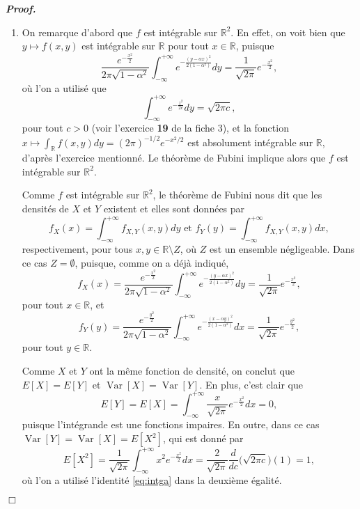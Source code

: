 \documentclass[11pt,a4paper]{article}
\newcommand{\RR}{\mathbb{R}}
\newenvironment{preuve}[1][]
{\vskip 2mm  \noindent\emph{\bf Proof#1. }}{$\Box$ \vskip 2mm}
\newcounter{exercice}
\begin{document}
		\begin{preuve}
			\begin{enumerate}
				\item On remarque d'abord que $f$ est intégrable sur $\RR^{2}$. 
				En effet, on voit bien que $y \mapsto f(x,y)$ est intégrable sur $\RR$ pour tout $x \in \RR$, 
				puisque 
				\[     \frac{e^{-\frac{x^2}{2}}}{2\pi \sqrt{1-\alpha^2}} \int_{- \infty}^{+ \infty} e^{-\frac{(y-\alpha x)^{2}}{2(1-\alpha^2)}} dy 
				= \frac{1}{\sqrt{2 \pi}} e^{-\frac{x^2}{2}},      \]
				où l'on a utilisé que 
				\begin{equation}
				\label{eq:intga}
				\int_{- \infty}^{+ \infty} e^{-\frac{z^{2}}{2 c}} dy = \sqrt{2 \pi c},
				\end{equation}          
				pour tout $c > 0$ (voir l'exercice \textbf{19} de la fiche 3), 
				et la fonction $x \mapsto \int_{\RR} f(x,y) dy = (2 \pi)^{-1/2} e^{-x^2/2}$ est absolument intégrable sur $\RR$, d'après l'exercice mentionné. 
				Le théorème de Fubini implique alors que $f$ est intégrable sur $\RR^{2}$. 
				
				Comme $f$ est intégrable sur $\RR^{2}$, le théorème de Fubini nous dit que 
				les densités de $X$ et $Y$ existent et elles sont données par 
				\[     f_{X}(x) = \int_{- \infty}^{+ \infty} f_{X,Y}(x,y) dy \text{ et } f_{Y}(y) = \int_{- \infty}^{+ \infty} f_{X,Y}(x,y) dx,     \]
				respectivement, pour tous $x,y \in \RR \setminus Z$, où $Z$ est un ensemble négligeable. 
				Dans ce cas $Z = \emptyset$, puisque, comme on a déjà indiqué, 
				\[     f_{X}(x) = \frac{e^{-\frac{x^2}{2}}}{2\pi \sqrt{1-\alpha^2}} \int_{- \infty}^{+ \infty} e^{-\frac{(y-\alpha x)^{2}}{2(1-\alpha^2)}} dy 
				= \frac{1}{\sqrt{2 \pi}} e^{-\frac{x^2}{2}},      \]
				pour tout $x \in \RR$, et 
				\[     f_{Y}(y) = \frac{e^{-\frac{y^2}{2}}}{2\pi \sqrt{1-\alpha^2}} \int_{- \infty}^{+ \infty} e^{-\frac{(x-\alpha y)^{2}}{2(1-\alpha^2)}} dx 
				= \frac{1}{\sqrt{2 \pi}} e^{-\frac{y^2}{2}},      \]
				pour tout $y \in \RR$. 
				
				Comme $X$ et $Y$ ont la même fonction de densité, on conclut que $E[X] = E[Y]$ et $\operatorname{Var}[X] = \operatorname{Var}[Y]$. 
				En plus, c'est clair que 
				\[    E[Y] = E[X] = \int_{- \infty}^{+ \infty} \frac{x}{\sqrt{2 \pi}} e^{-\frac{x^2}{2}} dx = 0,     \]
				puisque l'intégrande est une fonctions impaires. 
				En outre, dans ce cas $\operatorname{Var}[Y] = \operatorname{Var}[X] = E[X^{2}]$, qui est donné par 
				\begin{equation}
				\label{eq:intga2}
				E[X^{2}] = \frac{1}{\sqrt{2 \pi}} \int_{- \infty}^{+ \infty} x^{2} e^{-\frac{x^2}{2}} dx = \frac{2}{\sqrt{2 \pi}} \frac{d}{dc}\bigg( \sqrt{2 \pi c} \bigg)(1) = 1,     
				\end{equation}
				où l'on a utilisé l'identité \eqref{eq:intga} dans la deuxième égalité. 
				

\end{enumerate}
\end{preuve}
\end{document}
